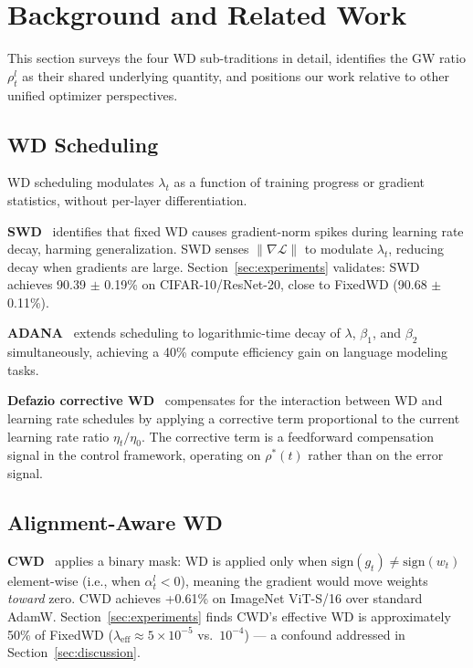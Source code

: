 \documentclass{article}
\begin{document}
\section{Background and Related Work}
\label{sec:background}

This section surveys the four WD sub-traditions in detail, identifies the GW ratio $\rho_t^l$ as their shared underlying quantity, and positions our work relative to other unified optimizer perspectives.

\subsection{WD Scheduling}

WD scheduling modulates $\lambda_t$ as a function of training progress or gradient statistics, without per-layer differentiation.

\textbf{SWD}~\citep{xie2023weight} identifies that fixed WD causes gradient-norm spikes during learning rate decay, harming generalization. SWD senses $\|\nabla \mathcal{L}\|$ to modulate $\lambda_t$, reducing decay when gradients are large. Section~\ref{sec:experiments} validates: SWD achieves 90.39 $\pm$ 0.19\% on CIFAR-10/ResNet-20, close to FixedWD (90.68 $\pm$ 0.11\%).

\textbf{ADANA}~\citep{ferbach2026adana} extends scheduling to logarithmic-time decay of $\lambda$, $\beta_1$, and $\beta_2$ simultaneously, achieving a 40\% compute efficiency gain on language modeling tasks.

\textbf{Defazio corrective WD}~\citep{defazio2025gw} compensates for the interaction between WD and learning rate schedules by applying a corrective term proportional to the current learning rate ratio $\eta_t / \eta_0$. The corrective term is a feedforward compensation signal in the control framework, operating on $\rho^*(t)$ rather than on the error signal.

\subsection{Alignment-Aware WD}

\textbf{CWD}~\citep{chen2026cwd} applies a binary mask: WD is applied only when $\text{sign}(g_t) \neq \text{sign}(w_t)$ element-wise (i.e., when $\alpha_t^l < 0$), meaning the gradient would move weights \textit{toward} zero. CWD achieves +0.61\% on ImageNet ViT-S/16 over standard AdamW. Section~\ref{sec:experiments} finds CWD's effective WD is approximately 50\% of FixedWD ($\lambda_{\text{eff}} \approx 5 \times 10^{-5}$ vs.~$10^{-4}$) --- a confound addressed in Section~\ref{sec:discussion}.
\end{document}
